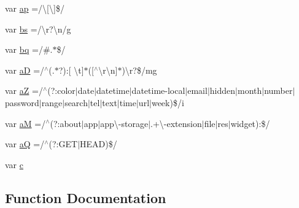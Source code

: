 \begin{DoxyCompactItemize}
var \hyperlink{docs_2_programmer's_manual_2html_2jquery_8js_a6ddf393cc7f9a8828e197bb0d9916c44}{ap} =/\textbackslash{}\mbox{[}\textbackslash{}\mbox{]}\$/
\item 
var \hyperlink{docs_2_programmer's_manual_2html_2jquery_8js_ae77642f8ef73fb9c20c2a737d956acda}{bs} =/\textbackslash{}r?\textbackslash{}n/g
\item 
var \hyperlink{docs_2_programmer's_manual_2html_2jquery_8js_af6ee77c71b2c89bdb365145ac5ad1219}{bq} =/\#.$\ast$\$/
\item 
var \hyperlink{docs_2_programmer's_manual_2html_2jquery_8js_ad223f5fba68c41c1236671ac5c5b0fcb}{a\+D} =/$^\wedge$(.$\ast$?)\+:\mbox{[} \textbackslash{}t\mbox{]}$\ast$(\mbox{[}$^\wedge$\textbackslash{}r\textbackslash{}n\mbox{]}$\ast$)\textbackslash{}r?\$/mg
\item 
var \hyperlink{docs_2_programmer's_manual_2html_2jquery_8js_ac87125cdee1a5e57da4ef619af49bc7d}{a\+Z} =/$^\wedge$(?\+:color$\vert$date$\vert$datetime$\vert$datetime-\/local$\vert$email$\vert$hidden$\vert$month$\vert$number$\vert$password$\vert$range$\vert$search$\vert$tel$\vert$text$\vert$time$\vert$url$\vert$week)\$/i
\item 
var \hyperlink{docs_2_programmer's_manual_2html_2jquery_8js_a8cc6111a5def3ea889157d13fb9a9672}{a\+M} =/$^\wedge$(?\+:about$\vert$app$\vert$app\textbackslash{}-\/storage$\vert$.+\textbackslash{}-\/extension$\vert$file$\vert$res$\vert$widget)\+:\$/
\item 
var \hyperlink{docs_2_programmer's_manual_2html_2jquery_8js_a79eb58dc6cdf0aef563d5dc1ded27df5}{a\+Q} =/$^\wedge$(?\+:G\+E\+T$\vert$H\+E\+A\+D)\$/
\item 
var \hyperlink{docs_2_programmer's_manual_2html_2jquery_8js_abce695e0af988ece0826d9ad59b8160d}{c}
\end{DoxyCompactItemize}


\subsection{Function Documentation}
\hypertarget{docs_2_programmer's_manual_2html_2jquery_8js_a2fa551895933fae935a0a6b87282241d}{}
